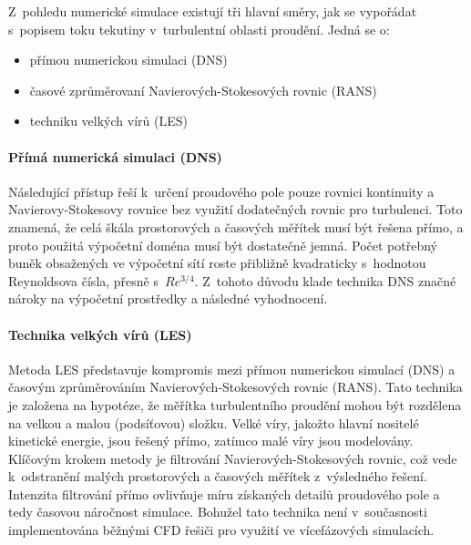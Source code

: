 Z~pohledu numerické simulace existují tři hlavní směry, jak se vypořádat s~popisem toku tekutiny v~turbulentní oblasti proudění. Jedná se o:
\begin{itemize}[itemsep=0pt,parsep=0pt,partopsep=0pt,topsep=0pt]
  \item přímou numerickou simulaci (DNS)
  \item časové zprůměrovaní Navierových-Stokesových rovnic (RANS)
  \item techniku velkých vírů (LES)
\end{itemize}

\paragraph{Přímá numerická simulaci (DNS)}
Následující přístup řeší k~určení proudového pole pouze rovnici kontinuity a Navierovy-Stokesovy rovnice bez využití dodatečných rovnic pro turbulenci. Toto znamená, že celá škála prostorových a časových měřítek musí být řešena přímo, a proto použitá výpočetní doména musí být dostatečně jemná. Počet potřebný buněk obsažených ve výpočetní sítí roste přibližně kvadraticky s~hodnotou Reynoldsova čísla, přesně s~$Re^{3/4}$. Z~tohoto důvodu klade technika DNS značné nároky na výpočetní prostředky a následné vyhodnocení.

\paragraph{Technika velkých vírů (LES)}
Metoda LES představuje kompromis mezi přímou numerickou simulací (DNS) a časovým zprůměrováním Navierových-Stokesových rovnic (RANS). Tato technika je založena na hypotéze, že měřítka turbulentního proudění mohou být rozdělena na velkou a malou (podsíťovou) složku. Velké víry, jakožto hlavní nositelé kinetické energie, jsou řešený přímo, zatímco malé víry jsou modelovány. Klí\-čo\-vým krokem metody je filtrování Navierových-Stokesových rovnic, což vede k~odstranění malých prostorových a časových měřítek z~výsledného řešení. Intenzita filtrování přímo ovlivňuje míru získaných detailů proudového pole a tedy časovou ná\-roč\-nost simulace. Bohužel tato technika není v~současnosti implementována běžnými CFD řešiči pro využití ve vícefázových simulacích. 

